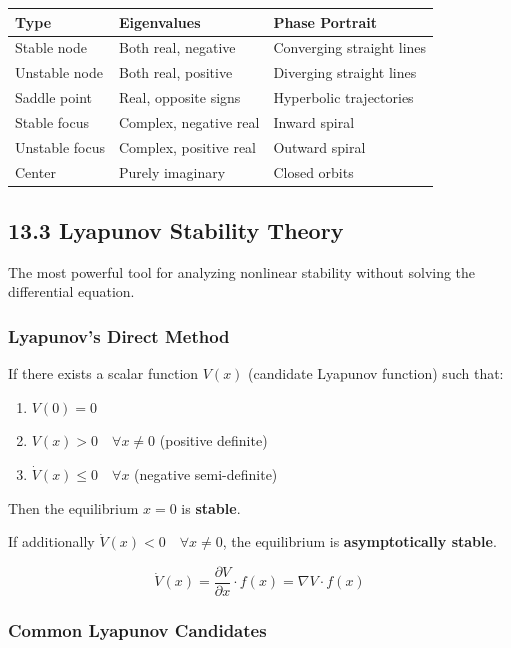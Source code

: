 \documentclass[11pt,a4paper]{book}
\begin{document}
\begin{itemize}
\begin{center}
\begin{tabular}{|l|l|l|}
\hline
Type & Eigenvalues & Phase Portrait \\
\hline
Stable node & Both real, negative & Converging straight lines \\
Unstable node & Both real, positive & Diverging straight lines \\
Saddle point & Real, opposite signs & Hyperbolic trajectories \\
Stable focus & Complex, negative real & Inward spiral \\
Unstable focus & Complex, positive real & Outward spiral \\
Center & Purely imaginary & Closed orbits \\
\hline
\end{tabular}
\end{center}

\medskip\noindent\hrulefill\medskip

\subsection{13.3 Lyapunov Stability Theory}

The most powerful tool for analyzing nonlinear stability without solving the differential equation.

\subsubsection{Lyapunov's Direct Method}

If there exists a scalar function $V(x)$ (candidate Lyapunov function) such that:

\begin{enumerate}
\item $V(0) = 0$
\item $V(x) > 0 \quad \forall x \neq 0$ (positive definite)
\item $\dot{V}(x) \leq 0 \quad \forall x$ (negative semi-definite)
\end{enumerate}

Then the equilibrium $x = 0$ is \textbf{stable}.

If additionally $\dot{V}(x) < 0 \quad \forall x \neq 0$, the equilibrium is \textbf{asymptotically stable}.

\[\dot{V}(x) = \frac{\partial V}{\partial x} \cdot f(x) = \nabla V \cdot f(x)\]

\subsubsection{Common Lyapunov Candidates}


\end{itemize}
\end{document}
